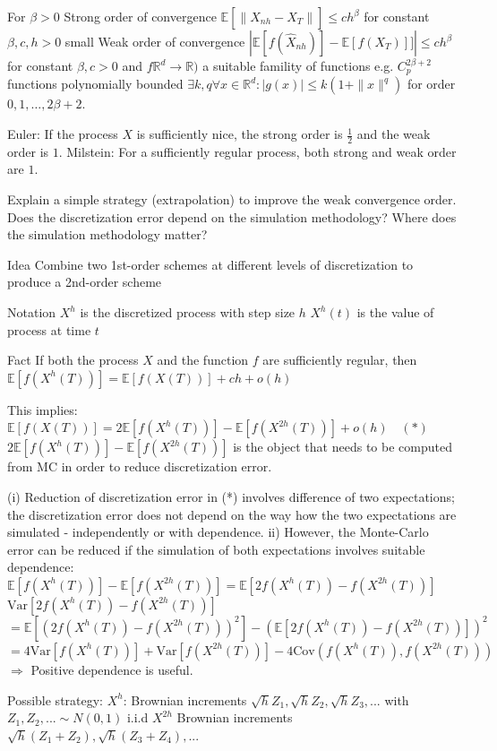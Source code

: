 For \( \beta > 0 \)
Strong order of convergence
\( \mathbb{E}[\|\hat{X}_{nh} - X_T\|] \leq ch^\beta \) for constant \(\beta, c, h > 0\) small
Weak order of convergence
\(| \mathbb{E}[f(\hat{X}_{nh})] - \mathbb{E}[f(X_T)]]| \leq ch^\beta \) for constant \( \beta, c > 0\) 
and \( f \mathbb{R}^{d} \to \mathbb{R}) \) a suitable famility of functions
e.g. \( C^{2\beta+2}_p \) functions polynomially bounded \( \exists k, q \forall x \in \mathbb{R}^d : |g(x)| \leq k(1+ \|x\|^q) \)
for order \( 0, 1, \dots, 2\beta + 2 \).

Euler: If the process \( X \) is sufficiently nice, the strong order is \( \frac{1}{2} \) and the weak order is \( 1 \).
Milstein: For a sufficiently regular process, both strong and weak order are \( 1 \).

Explain a simple strategy (extrapolation) to improve the weak convergence order.
Does the discretization error depend on the simulation methodology? Where does
the simulation methodology matter?

Idea
Combine two 1st-order schemes at different levels of discretization to produce a 2nd-order scheme

Notation
\( X^h \) is the discretized process with step size \( h \)
\(X^h(t)\) is the value of process at time \( t \)

Fact
If both the process \( X \) and the function \( f \) are sufficiently regular, then
\( \mathbb{E}[f(X^h(T))] = \mathbb{E}[f(X(T))] + ch + o(h) \)

This implies:
\( \mathbb{E}[f(X(T))] = 2\mathbb{E} [f(X^h(T))] - \mathbb{E}[f(X^{2h}(T))] + o(h) \quad (*) \)
\( 2\mathbb{E}[f(X^h(T))] - \mathbb{E}[f(X^{2h}(T))] \) is the object that needs to be computed from MC in order to reduce discretization error.

(i) Reduction of discretization error in (*)  involves difference of two expectations; the discretization error does not
depend on the way how the two expectations are simulated - independently or with dependence.
ii) However, the Monte-Carlo error can be reduced if the simulation of both expectations involves suitable
dependence:
\( \mathbb{E}[f(X^h(T))] - \mathbb{E}[f(X^{2h}(T))] = \mathbb{E}[2f(X^h(T)) - f(X^{2h}(T))] \)
\( \text{Var} [2f(X^h(T)) - f(X^{2h}(T))] \)
\( = \mathbb{E}[(2f(X^h(T)) - f(X^{2h}(T)))^2] - (\mathbb{E}[2f(X^h(T)) - f(X^{2h}(T))])^2 \)
\( = 4 \text{Var}[f(X^h(T))] + \text{Var}[f(X^{2h}(T))] - 4 \text{Cov} (f(X^h(T)), f(X^{2h}(T))) \)
\( \Rightarrow \) Positive dependence is useful.

Possible strategy:
\( X^h \): Brownian increments \( \sqrt{h} Z_1, \sqrt{h} Z_2, \sqrt{h} Z_3, ... \) with \(Z_1, Z_2, ... \sim N(0,1)\) i.i.d
\( X^{2h} \) Brownian increments \( \sqrt{h}(Z_1 + Z_2), \sqrt{h} (Z_3 + Z_4), ... \)

